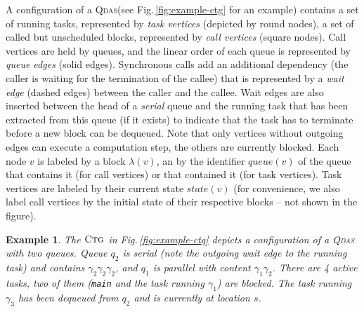\documentclass[runningheads,oribibl,]{article}
\newcommand{\qdas}{\textsc{Qdas}\xspace}
\newcommand{\queue}{\ensuremath{\textit{queue}}}
\newcommand{\state}{\ensuremath{\textit{state}}}
\newcommand{\ctg}{\ensuremath{\textsc{Ctg}}\xspace}
\def\eor{\ifmmode\squareforqed\else{\unskip\nobreak\hfil
\penalty50\hskip1em\null\nobreak\hfil$\dashv$
\parfillskip=0pt\finalhyphendemerits=0\endgraf}\fi}
\newtheorem{example}{Example}{}
\begin{document}
A configuration of a \qdas (see Fig.\,\ref{fig:example-ctg} for an
example) contains a set of running tasks, represented by \emph{task
  vertices} (depicted by round nodes), a set of called but unscheduled
blocks, represented by \emph{call vertices} (square nodes). Call
vertices are held by queues, and the linear order of each queue is
represented by \emph{queue edges} (solid edges). Synchronous calls add
an additional dependency (the caller is waiting for the termination of
the callee) that is represented by a \emph{wait edge} (dashed edges)
between the caller and the callee. Wait edges are also inserted
between the head of a \emph{serial} queue and the running task that
has been extracted from this queue (if it exists) to indicate that the
task has to terminate before a new block can be dequeued.  Note that
only vertices without outgoing edges can execute a computation step,
the others are currently blocked.  Each node $v$ is labeled by a block
$\lambda(v)$, an by the identifier $\queue(v)$ of the queue that
contains it (for call vertices) or that contained it (for task
vertices). Task vertices are labeled by their current state
$\state(v)$ (for convenience, we also label call vertices by the
initial state of their respective blocks -- not shown in the figure).



\vspace{-1ex}
\begin{example}
  The \ctg in Fig.\,\ref{fig:example-ctg} depicts a configuration of a
  \qdas with two queues. Queue $q_2$ is serial (note the outgoing wait
  edge to the running task) and contains $\gamma_2\gamma_2\gamma_2$,
  and $q_1$ is parallel with content $\gamma_1\gamma_2$. There are 4
  active tasks, two of them (\texttt{main} and the task running
  $\gamma_1$) are blocked. The task running $\gamma_3$ has been
  dequeued from $q_2$ and is currently at location $s$. \eor
\end{example}
\vspace{-1ex}
\end{document}
